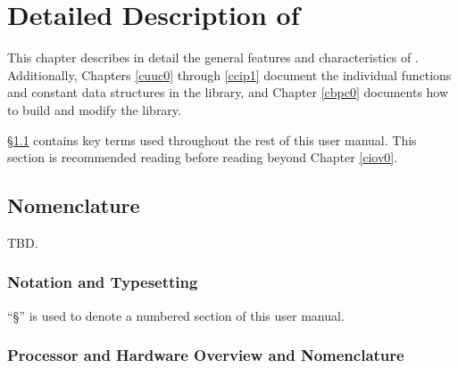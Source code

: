 \chapter{Detailed Description of \emph{\productbasenameshort{}}}
\label{cldd0}

This chapter describes in detail the general features and characteristics
of \emph{\productbasenameshort{}}\@.  Additionally, Chapters \ref{cuuc0}
through \ref{ccip1} document the individual functions and constant data
structures in the library, and Chapter \ref{cbpc0} documents how to build
and modify the library.

\S{}\ref{cldd0:snom0} contains key terms used throughout the rest of this
user manual.  This section is recommended reading before reading beyond
Chapter \ref{ciov0}.


\section{Nomenclature}
\label{cldd0:snom0}

TBD.



\subsection{Notation and Typesetting}
\label{cldd0:snom0:snts0}

``\S{}'' is used to denote a numbered section
of this user manual.


\subsection{Processor and Hardware Overview and Nomenclature}
\label{cldd0:snom0:spnc0}

